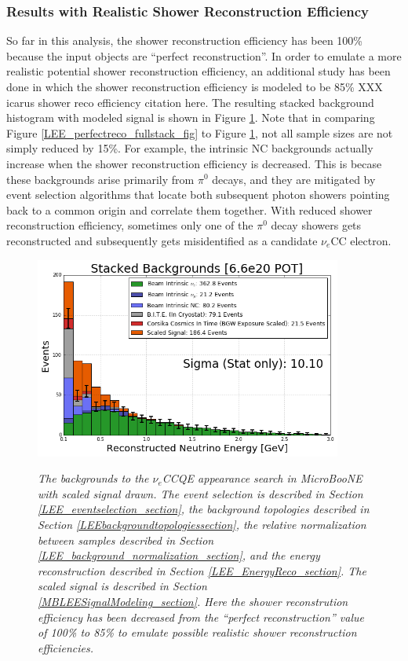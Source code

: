 \subsubsection{Results with Realistic Shower Reconstruction Efficiency}
So far in this analysis, the shower reconstruction efficiency has been 100\% because the input objects are ``perfect reconstruction''. In order to emulate a more realistic potential shower reconstruction efficiency, an additional study has been done in which the shower reconstruction efficiency is modeled to be 85\% XXX icarus shower reco efficiency citation here. The resulting stacked background histogram with modeled signal is shown in Figure \ref{LEE_recoemu_fullstack_fig}. Note that in comparing Figure \ref{LEE_perfectreco_fullstack_fig} to Figure \ref{LEE_recoemu_fullstack_fig}, not all sample sizes are not simply reduced by 15\%. For example, the intrinsic NC backgrounds actually increase when the shower reconstruction efficiency is decreased. This is becase these backgrounds arise primarily from $\pi^0$ decays, and they are mitigated by event selection algorithms that locate both subsequent photon showers pointing back to a common origin and correlate them together. With reduced shower reconstruction efficiency, sometimes only one of the $\pi^0$ decay showers gets reconstructed and subsequently gets misidentified as a candidate $\nu_e$CC electron.


\begin{figure}[ht!]
\centering
\includegraphics[width=0.9\textwidth]{Figures/LEE_recoemu_fullstack_WithAnalysisCuts.png}\\
\caption{\textit{The backgrounds to the $\nu_e$CCQE appearance search in MicroBooNE with scaled signal drawn. The event selection is described in Section \ref{LEE_eventselection_section}, the background topologies described in Section \ref{LEEbackgroundtopologiessection}, the relative normalization between samples described in Section \ref{LEE_background_normalization_section}, and the energy reconstruction described in Section \ref{LEE_EnergyReco_section}. The scaled signal is described in Section \ref{MBLEESignalModeling_section}. Here the shower reconstrution efficiency has been decreased from the ``perfect reconstruction'' value of 100\% to 85\% to emulate possible realistic shower reconstruction efficiencies.}}
\label{LEE_recoemu_fullstack_fig}
\end{figure}

